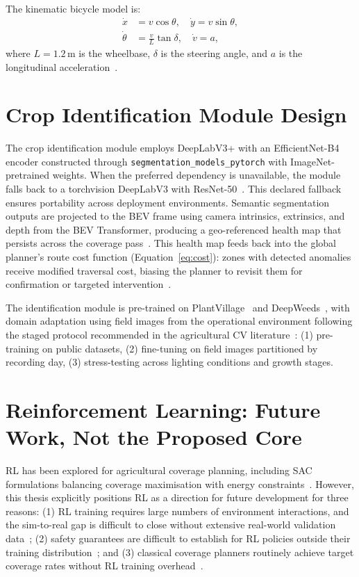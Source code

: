 \documentclass[12pt, a4paper]{article}
\begin{document}
The kinematic bicycle model is:
\begin{align}
  \dot{x} &= v\cos\theta, \quad \dot{y} = v\sin\theta, \nonumber\\
  \dot{\theta} &= \frac{v}{L}\tan\delta, \quad \dot{v} = a,
  \label{eq:bicycle}
\end{align}
where $L\!=\!1.2$\,m is the wheelbase, $\delta$ is the steering angle, and $a$ is the
longitudinal acceleration~\cite{ref233, ref234}.

\section{Crop Identification Module Design}

The crop identification module employs DeepLabV3+ with an EfficientNet-B4 encoder
constructed through \texttt{segmentation\_models\_pytorch} with ImageNet-pretrained
weights. When the preferred dependency is unavailable, the module falls back to a
torchvision DeepLabV3 with ResNet-50~\cite{ref234}. This declared fallback ensures
portability across deployment environments. Semantic segmentation outputs are projected to
the BEV frame using camera intrinsics, extrinsics, and depth from the BEV Transformer,
producing a geo-referenced health map that persists across the coverage
pass~\cite{ref233}. This health map feeds back into the global planner's route cost
function (Equation~\eqref{eq:cost}): zones with detected anomalies receive modified
traversal cost, biasing the planner to revisit them for confirmation or targeted
intervention~\cite{ref2}.

The identification module is pre-trained on PlantVillage~\cite{ref157, ref159} and
DeepWeeds~\cite{ref167, ref168}, with domain adaptation using field images from the
operational environment following the staged protocol recommended in the agricultural CV
literature~\cite{ref154, ref208}: (1) pre-training on public datasets, (2) fine-tuning
on field images partitioned by recording day, (3) stress-testing across lighting
conditions and growth stages.

\section{Reinforcement Learning: Future Work, Not the Proposed Core}
\label{sec:rl_future}

RL has been explored for agricultural coverage planning, including SAC formulations
balancing coverage maximisation with energy constraints~\cite{ref108}. However, this
thesis explicitly positions RL as a direction for future development for three reasons:
(1) RL training requires large numbers of environment interactions, and the sim-to-real
gap is difficult to close without extensive real-world validation data~\cite{ref102, ref130};
(2) safety guarantees are difficult to establish for RL policies outside their training
distribution~\cite{ref129, ref130}; and (3) classical coverage planners routinely achieve
target coverage rates without RL training overhead~\cite{ref1, ref104}.
\end{document}
